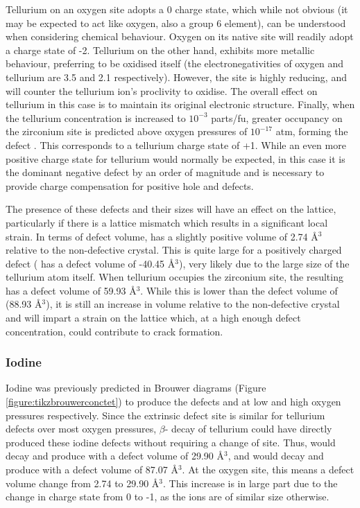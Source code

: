 Tellurium on an oxygen site adopts a 0 charge state, which while not obvious (it may be expected to act like oxygen, also a group 6 element), can be understood when considering chemical behaviour. Oxygen on its native site will readily adopt a charge state of -2. Tellurium on the other hand, exhibits more metallic behaviour, preferring to be oxidised itself (the electronegativities of oxygen and tellurium are 3.5 and 2.1 respectively). However, the  site is highly reducing, and will counter the tellurium ion's proclivity to oxidise. The overall effect on tellurium in this case is to maintain its original electronic structure. Finally, when the tellurium concentration is increased to $10^{-3}$ parts/fu, greater occupancy on the zirconium site is predicted above oxygen pressures of $10^{-17}$ atm, forming the defect . This corresponds to a tellurium charge state of +1. While an even more positive charge state for tellurium would normally be expected, in this case it is the dominant negative defect by an order of magnitude and is necessary to provide charge compensation for positive hole and  defects. 

The presence of these defects and their sizes will have an effect on the lattice, particularly if there is a lattice mismatch which results in a significant local strain. In terms of defect volume,  has a slightly positive volume of 2.74 \r{A}$^{3}$ relative to the non-defective crystal. This is quite large for a positively charged defect ( has a defect volume of -40.45 \r{A}$^{3}$), very likely due to the large size of the tellurium atom itself. When tellurium occupies the zirconium site, the resulting  has a defect volume of 59.93 \r{A}$^{3}$. While this is lower than the defect volume of  (88.93 \r{A}$^{3}$), it is still an increase in volume relative to the non-defective crystal and will impart a strain on the lattice which, at a high enough defect concentration, could contribute to crack formation.

\subsubsection{Iodine}

Iodine was previously predicted in Brouwer diagrams (Figure \ref{figure:tikzbrouwerconctet}) to produce the defects  and  at low and high oxygen pressures respectively. Since the extrinsic defect site is similar for tellurium defects over most oxygen pressures, $\beta$- decay of tellurium could have directly produced these iodine defects without requiring a change of site. Thus,  would decay and produce  with a defect volume of 29.90 \r{A}$^{3}$, and  would decay and produce  with a defect volume of 87.07 \r{A}$^{3}$. At the oxygen site, this means a defect volume change from 2.74 to 29.90 \r{A}$^{3}$. This increase is in large part due to the change in charge state from 0 to -1, as the ions are of similar size otherwise. 

